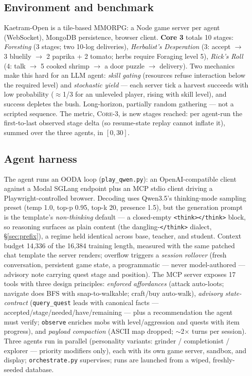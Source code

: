 \documentclass[11pt]{article}
\begin{document}
\subsection{Environment and benchmark}
Kaetram-Open is a tile-based MMORPG: a Node game server per agent (WebSocket), MongoDB
persistence, browser client. \textbf{Core 3} totals 10 stages: \emph{Foresting} (3 stages; two
10-log deliveries), \emph{Herbalist's Desperation} (3: accept $\rightarrow$ 3 bluelily
$\rightarrow$ 2 paprika + 2 tomato; herbs require Foraging level 5), \emph{Rick's Roll} (4:
talk $\rightarrow$ 5 cooked shrimp $\rightarrow$ a door puzzle $\rightarrow$ delivery). Two
mechanics make this hard for an LLM agent: \emph{skill gating} (resources refuse interaction
below the required level) and \emph{stochastic yield} --- each server tick a harvest succeeds with
low probability ($\approx$1/3 for an unleveled player, rising with skill level), and success
depletes the bush.
Long-horizon, partially random gathering --- not a scripted sequence. The metric, \textsc{Core-3},
is new stages reached: per agent-run the first-to-last observed stage delta (so resume-state replay
cannot inflate it), summed over the three agents, in $[0,30]$.

\subsection{Agent harness}
The agent runs an OODA loop (\texttt{play\_qwen.py}): an OpenAI-compatible client against a Modal
SGLang endpoint plus an MCP stdio client driving a Playwright-controlled browser. Decoding uses
Qwen3.5's thinking-mode sampling preset (temp 1.0, top-p 0.95, top-k 20, presence 1.5), but the
generation prompt is the template's \emph{non-thinking} default --- a closed-empty
\texttt{<think></think>} block, so reasoning surfaces as plain content (the dangling-\texttt{</think>}
dialect, \S\ref{sec:prefix}), a regime held identical across base, teacher, and student. Context budget 14{,}336 of
the 16{,}384 training length, measured with the same patched chat template the server renders;
overflow triggers a \emph{session rollover} (fresh conversation, persistent game state, a
programmatic --- never model-authored --- advisory note carrying quest stage and position).
The MCP server exposes 17 tools with three design principles: \emph{enforced affordances}
(attack auto-loots; navigate does BFS with snap-to-walkable; craft/buy auto-walk),
\emph{advisory state-contract} (\texttt{query\_quest} leads with canonical facts ---
accepted/stage/needed/have/remaining --- plus a recommendation the agent must verify;
\texttt{observe} enriches mobs with level/aggression and quests with item progress), and
\emph{payload compaction} (ASCII map dropped; $\sim$2$\times$ turns per session).
Three agents run in parallel (personality variants: grinder / completionist / explorer ---
priority modifiers only), each with its own game server, sandbox, and display;
\texttt{orchestrate.py} supervises; runs are launched from a wiped, freshly-seeded database.
\end{document}
